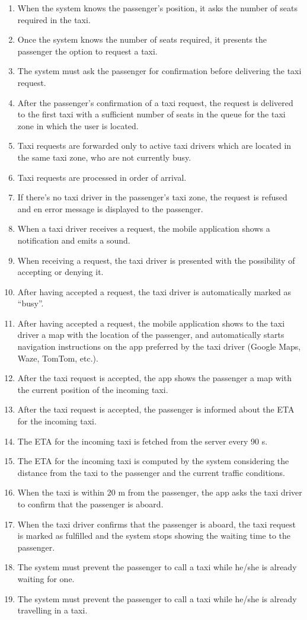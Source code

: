 \begin{enumerate}
	\item When the system knows the passenger's position, it asks the number of seats required in the taxi.
	\item Once the system knows the number of seats required, it presents the passenger the option to request a taxi.
	\item The system must ask the passenger for confirmation before delivering the taxi request.
	\item After the passenger's confirmation of a taxi request, the request is delivered to the first taxi with a sufficient number of seats in the queue for the taxi zone in which the user is located.
	\item Taxi requests are forwarded only to active taxi drivers which are located in the same taxi zone, who are not currently busy.
	\item Taxi requests are processed in order of arrival.
	\item If there's no taxi driver in the passenger's taxi zone, the request is refused and en error message is displayed to the passenger.
	\item When a taxi driver receives a request, the mobile application shows a notification and emits a sound.
	\item When receiving a request, the taxi driver is presented with the possibility of accepting or denying it.
	\item After having accepted a request, the taxi driver is automatically marked as ``busy''.
	\item After having accepted a request, the mobile application shows to the taxi driver a map with the location of the passenger, and automatically starts navigation instructions on the app preferred by the taxi driver (Google Maps, Waze, TomTom, etc.).
	\item After the taxi request is accepted, the app shows the passenger a map with the current position of the incoming taxi.
	\item After the taxi request is accepted, the passenger is informed about the ETA for the incoming taxi.
	\item The ETA for the incoming taxi is fetched from the server every 90 s.
	\item The ETA for the incoming taxi is computed by the system considering the distance from the taxi to the passenger and the current traffic conditions.
	\item When the taxi is within 20 m from the passenger, the app asks the taxi driver to confirm that the passenger is aboard.
	\item When the taxi driver confirms that the passenger is aboard, the taxi request is marked as fulfilled and the system stops showing the waiting time to the passenger.
	\item The system must prevent the passenger to call a taxi while he/she is already waiting for one.
	\item The system must prevent the passenger to call a taxi while he/she is already travelling in a taxi.
\end{enumerate}

